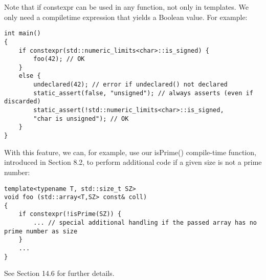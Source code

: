 Note that if constexpr can be used in any function, not only in templates. We only need a compiletime expression that yields a Boolean value. For example:

\begin{lstlisting}[style=styleCXX]
int main()
{
	if constexpr(std::numeric_limits<char>::is_signed) {
		foo(42); // OK
	}
	else {
		undeclared(42); // error if undeclared() not declared
		static_assert(false, "unsigned"); // always asserts (even if discarded)
		static_assert(!std::numeric_limits<char>::is_signed,
		"char is unsigned"); // OK
	}
}
\end{lstlisting}

With this feature, we can, for example, use our isPrime() compile-time function, introduced in Section 8.2, to perform additional code if a given size is not a prime number:

\begin{lstlisting}[style=styleCXX]
template<typename T, std::size_t SZ>
void foo (std::array<T,SZ> const& coll)
{
	if constexpr(!isPrime(SZ)) {
		... // special additional handling if the passed array has no prime number as size
	}
	...
}
\end{lstlisting}

See Section 14.6 for further details.



























